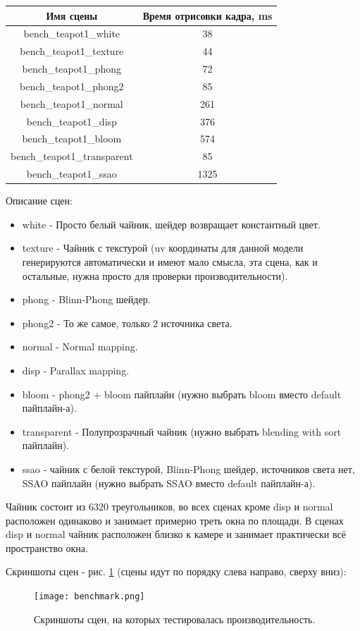 \documentclass[14pt]{extarticle}
\begin{document}
\begin{center}
\begin{tabular}{|c|c|}
	\hline
	Имя сцены & Время отрисовки кадра, ms \\
	\hline
	bench\_teapot1\_white & 38 \\
	bench\_teapot1\_texture & 44 \\
	bench\_teapot1\_phong & 72 \\
	bench\_teapot1\_phong2 & 85 \\
	bench\_teapot1\_normal & 261 \\
	bench\_teapot1\_disp & 376 \\
	bench\_teapot1\_bloom & 574 \\
	bench\_teapot1\_transparent & 85 \\
	bench\_teapot1\_ssao & 1325 \\
	\hline
\end{tabular}
\end{center}

Описание сцен: 
\begin{itemize}
	\item white - Просто белый чайник, шейдер возвращает константный цвет.
	\item texture - Чайник с текстурой (uv координаты для данной модели генерируются автоматически и имеют мало смысла, эта сцена, как и остальные, нужна просто для проверки производительности).
	\item phong - Blinn-Phong шейдер.
	\item phong2 - То же самое, только 2 источника света.
	\item normal - Normal mapping.
	\item disp - Parallax mapping.
	\item bloom - phong2 + bloom пайплайн (нужно выбрать bloom вместо default пайплайн-а).
	\item transparent - Полупрозрачный чайник (нужно выбрать blending with sort пайплайн).
	\item ssao - чайник с белой текстурой, Blinn-Phong шейдер, источников света нет, SSAO пайплайн (нужно выбрать SSAO вместо default пайплайн-а).
\end{itemize}

Чайник состоит из 6320 треугольников, во всех сценах кроме disp и normal расположен одинаково и занимает примерно треть окна по площади. В сценах disp и normal чайник расположен близко к камере и занимает практически всё пространство окна.

Скриншоты сцен - рис. \ref{fig:bench} (сцены идут по порядку слева направо, сверху вниз):
\begin{figure}
	\label{fig:bench}
	\caption{Скриншоты сцен, на которых тестировалась производительность.}
	\texttt{[image: benchmark.png]}
\end{figure}
\end{document}
